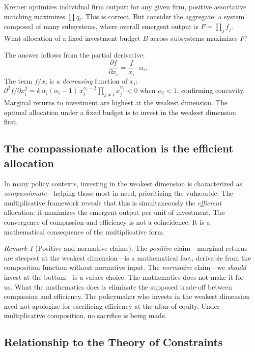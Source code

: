 \documentclass[12pt, a4paper]{article}
\theoremstyle{definition}
\theoremstyle{remark}
\newtheorem{remark}[theorem]{Remark}
\begin{document}
Kremer optimizes individual firm output: for any given firm, positive assortative matching maximizes $\prod q_i$. This is correct. But consider the aggregate: a system composed of many subsystems, where overall emergent output is $F = \prod_j f_j$. What allocation of a fixed investment budget $B$ across subsystems maximizes $F$?

The answer follows from the partial derivative:
\begin{equation}\label{eq:marginal}
\frac{\partial f}{\partial x_i} = \frac{f}{x_i} \cdot \alpha_i.
\end{equation}
The term $f / x_i$ is a \textit{decreasing} function of $x_i$: $\partial^2 f / \partial x_i^2 = k \, \alpha_i(\alpha_i - 1) \, x_i^{\alpha_i - 2} \prod_{j \neq i} x_j^{\alpha_j} < 0$ when $\alpha_i < 1$, confirming concavity. Marginal returns to investment are highest at the weakest dimension. The optimal allocation under a fixed budget is to invest in the weakest dimension first.

\subsection{The compassionate allocation is the efficient allocation}

In many policy contexts, investing in the weakest dimension is characterized as \textit{compassionate}---helping those most in need, prioritizing the vulnerable. The multiplicative framework reveals that this is simultaneously the \textit{efficient} allocation: it maximizes the emergent output per unit of investment. The convergence of compassion and efficiency is not a coincidence. It is a mathematical consequence of the multiplicative form.

\begin{remark}[Positive and normative claims]
The \textit{positive} claim---marginal returns are steepest at the weakest dimension---is a mathematical fact, derivable from the composition function without normative input. The \textit{normative} claim---we \textit{should} invest at the bottom---is a values choice. The mathematics does not make it for us. What the mathematics does is eliminate the supposed trade-off between compassion and efficiency. The policymaker who invests in the weakest dimension need not apologize for sacrificing efficiency at the altar of equity. Under multiplicative composition, no sacrifice is being made.
\end{remark}

\subsection{Relationship to the Theory of Constraints}
\end{document}
